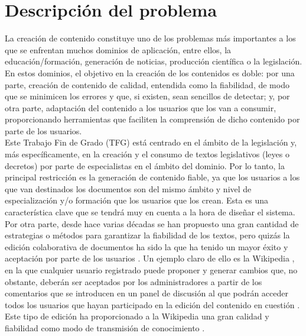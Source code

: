 \section{Descripción del problema}
La creación de contenido constituye uno de los problemas más importantes a los que se enfrentan muchos dominios de aplicación, entre ellos, la educación/formación, generación de noticias, producción científica o la legislación. En estos dominios, el objetivo en la creación de los contenidos es doble: por una parte, creación de contenido de calidad, entendida como la fiabilidad, de modo que se minimicen los errores y que, si existen, sean sencillos de detectar; y, por otra parte, adaptación del contenido a los usuarios que los van a consumir, proporcionando herramientas que faciliten la comprensión de dicho contenido por parte de los usuarios.
\\

Este Trabajo Fin de Grado (TFG) está centrado en el ámbito de la legislación y, más específicamente, en la creación y el consumo de textos legislativos (leyes o decretos) por parte de especialistas en el ámbito del dominio. Por lo tanto, la principal restricción es la generación de contenido fiable, ya que los usuarios a los que van destinados los documentos son del mismo ámbito y nivel de especialización y/o formación que los usuarios que los crean. Esta es una característica clave que se tendrá muy en cuenta a la hora de diseñar el sistema.
\\

Por otra parte, desde hace varias décadas se han propuesto una gran cantidad de estrategias o métodos para garantizar la fiabilidad de los textos, pero quizás la edición colaborativa de documentos ha sido la que ha tenido un mayor éxito y aceptación por parte de los usuarios \cite{collaborative}. Un ejemplo claro de ello es la Wikipedia \cite{wikipedia}, en la que cualquier usuario registrado puede proponer y generar cambios que, no obstante, deberán ser aceptados por los administradores a partir de los comentarios que se introducen en un panel de discusión al que podrán acceder todos los usuarios que hayan participado en la edición del contenido en cuestión \cite{knowledge}. Este tipo de edición ha proporcionado a la Wikipedia una gran calidad y fiabilidad como modo de transmisión de conocimiento \cite{trustworthiness}.
\\

